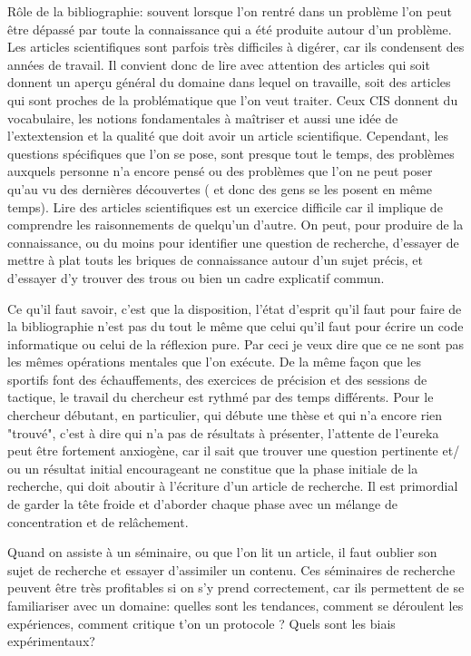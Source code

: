 \documentclass[24pt]{article}
\begin{document}
        Rôle de la bibliographie: souvent lorsque l'on rentré dans un problème l'on peut être dépassé par toute la connaissance qui a été produite autour d'un problème. Les articles scientifiques sont parfois très difficiles à digérer, car ils condensent des années de travail.   Il convient donc de lire avec attention des articles qui soit donnent un aperçu général du domaine dans lequel on travaille, soit des articles qui sont proches de la problématique que l'on veut traiter. Ceux CIS donnent du vocabulaire,  les notions fondamentales à maîtriser et aussi une idée de l'extextension et la qualité que doit avoir un article scientifique.   Cependant, les questions spécifiques que l'on se pose, sont presque tout le temps, des problèmes auxquels personne n'a encore pensé ou des problèmes que l'on ne peut poser qu'au vu des dernières découvertes ( et donc des gens se les posent en même temps). 
        Lire des articles scientifiques est un exercice difficile  car il implique de comprendre les raisonnements de quelqu'un d'autre.    On peut, pour produire de la connaissance, ou du moins pour identifier une question de recherche, d'essayer de mettre à plat touts les briques de connaissance autour d'un sujet précis, et d'essayer d'y trouver des trous ou bien un cadre explicatif commun.

        Ce qu'il faut savoir, c'est que la disposition, l'état d'esprit qu'il faut pour faire de la bibliographie n'est pas du tout le même que celui qu'il faut pour écrire un code informatique ou celui de la réflexion pure. Par ceci je veux dire que ce ne sont pas les mêmes opérations mentales que l'on exécute. De la même façon que les sportifs font des échauffements, des exercices de précision et des sessions de tactique, le travail du chercheur est rythmé par des temps différents. Pour le chercheur débutant, en particulier, qui débute une thèse et qui n'a encore rien "trouvé", c'est à dire qui n'a pas de résultats à présenter, l'attente de l'eureka peut être fortement anxiogène, car il sait que trouver une question pertinente et/ ou un résultat initial encourageant ne constitue que la phase initiale de la recherche, qui doit aboutir à l'écriture d'un article de recherche.
        Il est primordial de garder la tête froide et d'aborder chaque phase avec un mélange de concentration et de relâchement.  


        Quand on assiste à un séminaire, ou que l'on lit un article, il faut oublier son sujet de recherche et essayer d'assimiler un contenu. Ces séminaires de recherche peuvent être très profitables si on s'y prend correctement, car ils permettent de se familiariser avec un domaine: quelles sont les tendances, comment se déroulent les expériences, comment critique t'on un protocole ? Quels sont les biais expérimentaux?
\end{document}
